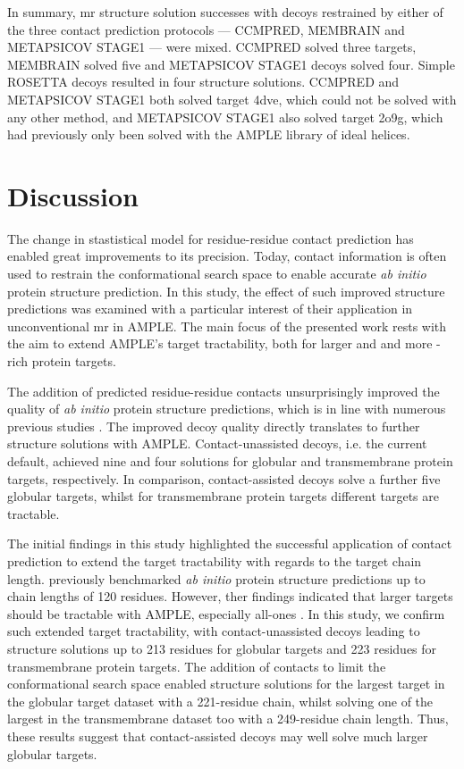 In summary, \gls{mr} structure solution successes with decoys restrained by either of the three contact prediction protocols --- CCMPRED, MEMBRAIN and METAPSICOV STAGE1 --- were mixed. CCMPRED solved three targets, MEMBRAIN solved
five and METAPSICOV STAGE1 decoys solved four. Simple ROSETTA decoys resulted in four structure solutions. CCMPRED and METAPSICOV STAGE1 both solved target 4dve, which could not be solved with any other method, and METAPSICOV STAGE1 also solved target 2o9g, which had previously only been solved with the AMPLE library of ideal helices.

\section{Discussion}
The change in stastistical model for residue-residue contact prediction has enabled great improvements to its precision. Today, contact information is often used to restrain the conformational search space to enable accurate \textit{ab initio} protein structure prediction. In this study, the effect of such improved structure predictions was examined with a particular interest of their application in unconventional \gls{mr} in AMPLE. The main focus of the presented work rests with the aim to extend AMPLE's target tractability, both for larger and and more \textbeta-rich protein targets.

The addition of predicted residue-residue contacts unsurprisingly improved the quality of \textit{ab initio} protein structure predictions, which is in line with numerous previous studies \cite[e.g.,][]{Marks2011-os,Michel2014-eg,Kosciolek2014-bt,Ovchinnikov2015-tn,Ovchinnikov2016-jj,Michel2017-xh,De_Oliveira2017-sg,Ovchinnikov2017-nd,Wang2017-rx}. The improved decoy quality directly translates to further structure solutions with AMPLE. Contact-unassisted decoys, i.e. the current default, achieved nine and four solutions for globular and transmembrane protein targets, respectively. In comparison, contact-assisted decoys solve a further five globular targets, whilst for transmembrane protein targets different targets are tractable.

The initial findings in this study highlighted the successful application of contact prediction to extend the target tractability with regards to the target chain length. \textcite{Bibby2012-lm} previously benchmarked \textit{ab initio} protein structure predictions up to chain lengths of 120 residues. However, ther findings indicated that larger targets should be tractable with AMPLE, especially all-\textalpha ones \cite{Bibby2012-lm}. In this study, we confirm such extended target tractability, with contact-unassisted decoys leading to structure solutions up to 213 residues for globular targets and 223 residues for transmembrane protein targets. The addition of contacts to limit the conformational search space enabled structure solutions for the largest target in the globular target dataset with a 221-residue chain, whilst solving one of the largest in the transmembrane dataset too with a 249-residue chain length. Thus, these results suggest that contact-assisted decoys may well solve much larger globular targets.

